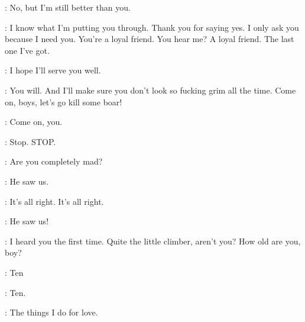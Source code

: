 \NED: No, but I'm still better than you. 

\ROBERT: I know what I'm putting you through. Thank you for saying yes. I only ask you because I need you. You're a loyal friend. You hear me? A loyal friend. The last one I've got. 

\NED: I hope I'll serve you well. 

\ROBERT: You will. And I'll make sure you don't look so fucking grim all the time. Come on, boys, let's go kill some boar! 


\BRAN: Come on, you. 


\CERSEI: Stop. STOP. 


\JAIME: Are you completely mad? 

\CERSEI: He saw us. 

\JAIME: It's all right. It's all right. 

\CERSEI: He saw us! 

\JAIME: I heard you the first time.  Quite the little climber, aren't you? How old are you, boy? 

\BRAN: Ten 

\JAIME: Ten. 


\JAIME: The things I do for love. 



